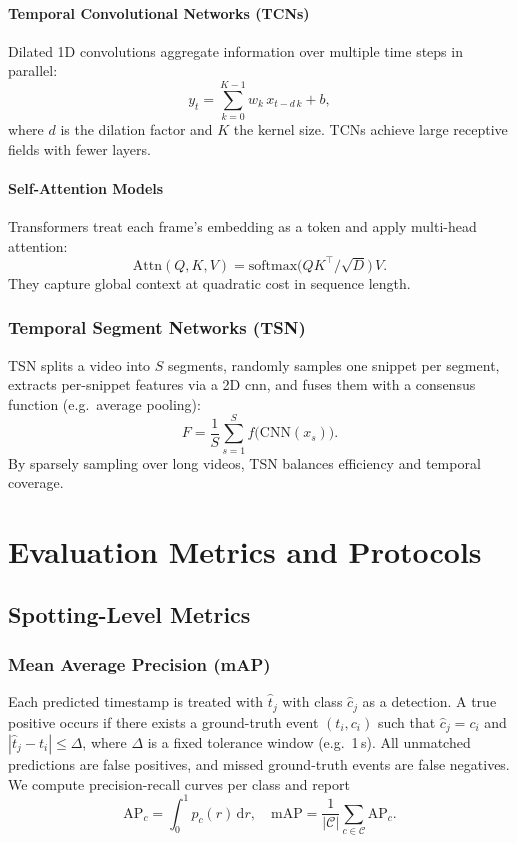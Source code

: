 \paragraph{Temporal Convolutional Networks (TCNs)}  
Dilated 1D convolutions aggregate information over multiple time steps in parallel:
\[
y_t = \sum_{k=0}^{K-1} w_k\,x_{t - d\,k} + b,
\]
where \(d\) is the dilation factor and \(K\) the kernel size. TCNs achieve large receptive fields with fewer layers.

\paragraph{Self-Attention Models}  
Transformers treat each frame's embedding as a token and apply multi-head attention:
\[
\mathrm{Attn}(Q,K,V) = \mathrm{softmax}\bigl(QK^\top/\sqrt{D}\bigr)\,V.
\]
They capture global context at quadratic cost in sequence length.

\subsubsection{Temporal Segment Networks (TSN)}  
TSN splits a video into \(S\) segments, randomly samples one snippet per segment, extracts per-snippet features via a 2D \acrshort{cnn}, and fuses them with a consensus function (e.g.\ average pooling):
\[
F = \frac{1}{S}\sum_{s=1}^{S}f\bigl(\mathrm{CNN}(x_s)\bigr).
\]
By sparsely sampling over long videos, TSN balances efficiency and temporal coverage.

\section{Evaluation Metrics and Protocols}
\label{sec:evaluation}

\subsection{Spotting-Level Metrics}
\subsubsection{Mean Average Precision (mAP)}
Each predicted timestamp is treated with $\hat t_j$ with class $\hat c_j$ as a detection. A true positive occurs if there exists a ground-truth event $(t_i,c_i)$ such that $\hat c_j = c_i$ and $|\hat t_j - t_i|\le\Delta$, where $\Delta$ is a fixed tolerance window (e.g.\ 1\,s). All unmatched predictions are false positives, and missed ground-truth events are false negatives. We compute precision-recall curves per class and report
\[
\mathrm{AP}_c = \int_{0}^{1} p_c(r)\,\mathrm{d}r,\quad
\mathrm{mAP} = \frac{1}{|\mathcal{C}|}\sum_{c\in\mathcal{C}}\mathrm{AP}_c.
\]

